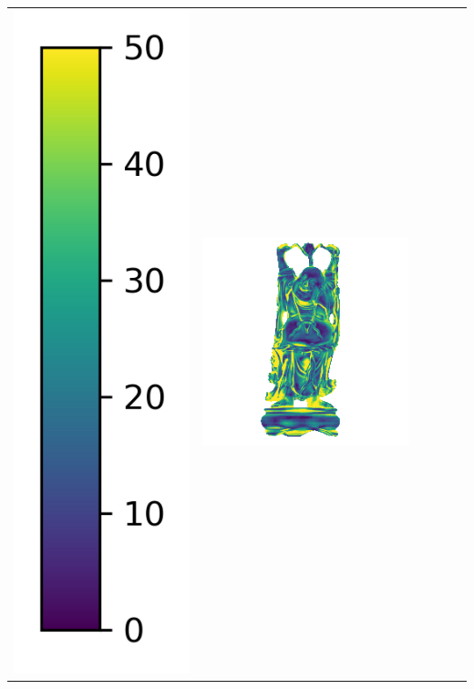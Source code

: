 \begin{center}
\begin{tabularx}{\linewidth}{@{}Y@{}Y@{}Y@{}Y@{}Y@{}Y@{}}
\includegraphics[width=0.2\linewidth]{semisynthetic/colorbar_error_vertical.png} &
\includegraphics[width=\linewidth]{semisynthetic/20150514_20_ours_err.png} &

\end{tabularx}
\end{center}
